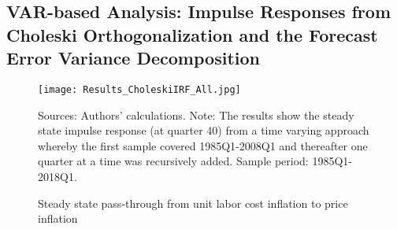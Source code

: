\documentclass[11pt]{article}
\begin{document}
\begin{appendices}




\section{VAR-based Analysis: Impulse Responses from Choleski Orthogonalization and the Forecast Error Variance Decomposition}
\label{AppendixCholeskiCountries}


\begin{figure}[!htbp]
\begin{center}
\caption{Steady state pass-through from unit labor cost inflation to price inflation}\label{fig:TVP_Choleski}
\texttt{[image: Results\_CholeskiIRF\_All.jpg]}
\begin{minipage}{\textwidth} {\footnotesize
Sources: Authors' calculations.
Note: The results show the steady state impulse response (at quarter 40) from a time varying approach whereby the first sample covered 1985Q1-2008Q1 and thereafter one quarter at a time was recursively added.
Sample period: 1985Q1-2018Q1.\par}
\end{minipage}
\end{center}
\end{figure}

\clearpage



\end{appendices}
\end{document}
